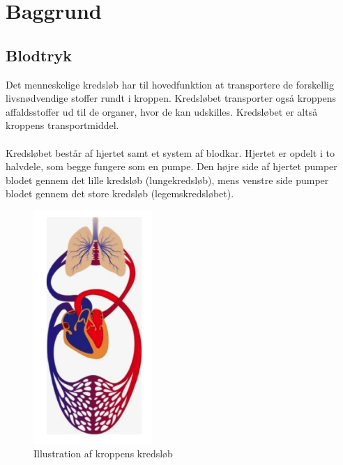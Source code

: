 \chapter{Baggrund}
\section{Blodtryk}
Det menneskelige kredsløb har til hovedfunktion at transportere de forskellig livsnødvendige stoffer rundt i kroppen. Kredsløbet transporter også kroppens affaldsstoffer ud til de organer, hvor de kan udskilles. Kredsløbet er altså kroppens transportmiddel. 
\\ \\
Kredsløbet består af hjertet samt et system af blodkar. Hjertet er opdelt i to halvdele, som begge fungere som en pumpe. Den højre side af hjertet pumper blodet gennem det lille kredsløb (lungekredsløb), mens venstre side pumper blodet gennem det store kredsløb (legemskredsløbet). 

\begin{figure}[H]
	\centering
	\includegraphics[width=0.4\textwidth]{Figurer/Snip20151209_69}
	\caption{Illustration af kroppens kredsløb}
\end{figure}

